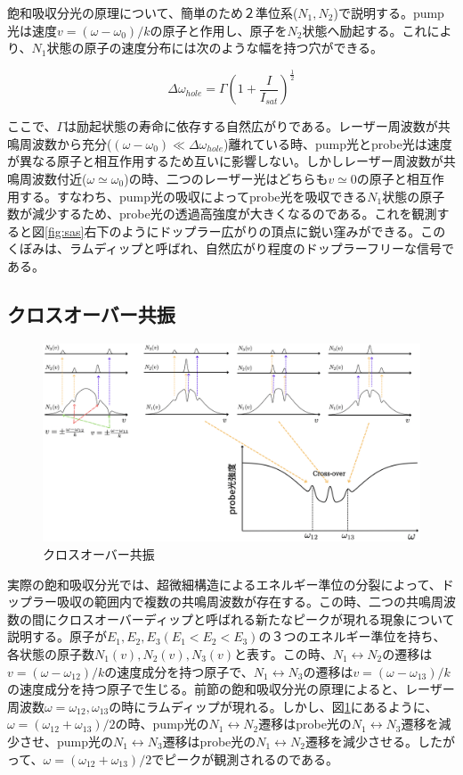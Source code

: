 \documentclass[dvipdfmx]{jsreport}
\begin{document}
飽和吸収分光の原理について、簡単のため２準位系($N_1, N_2$)で説明する。pump光は速度$v = (\omega - \omega_0)/k$の原子と作用し、原子を$N_2$状態へ励起する。これにより、$N_1$状態の原子の速度分布には次のような幅を持つ穴ができる。\cite{foot}

\begin{equation}
\Delta\omega_{hole} = \Gamma \left( 1 + \frac{I}{I_{sat}} \right) ^ \frac{1}{2}
\end{equation}

ここで、$\Gamma$は励起状態の寿命に依存する自然広がりである。レーザー周波数が共鳴周波数から充分($(\omega - \omega_0) \ll \Delta\omega_{hole}$)離れている時、pump光とprobe光は速度が異なる原子と相互作用するため互いに影響しない。しかしレーザー周波数が共鳴周波数付近($\omega \simeq \omega_0$)の時、二つのレーザー光はどちらも$v \simeq 0$の原子と相互作用する。すなわち、pump光の吸収によってprobe光を吸収できる$N_1$状態の原子数が減少するため、probe光の透過高強度が大きくなるのである。これを観測すると図\ref{fig:sas}右下のようにドップラー広がりの頂点に鋭い窪みができる。このくぼみは、ラムディップと呼ばれ、自然広がり程度のドップラーフリーな信号である。

\subsection{クロスオーバー共振}
\begin{figure}
\centering
\includegraphics[width=1\textwidth]{images/cross-over_graph.png}
\caption{\label{fig:cross-over}クロスオーバー共振}
\end{figure}
実際の飽和吸収分光では、超微細構造によるエネルギー準位の分裂によって、ドップラー吸収の範囲内で複数の共鳴周波数が存在する。この時、二つの共鳴周波数の間にクロスオーバーディップと呼ばれる新たなピークが現れる現象について説明する。原子が$E_1, E_2, E_3(E_1 < E_2 < E_3)$の３つのエネルギー準位を持ち、各状態の原子数$N_1(v), N_2(v), N_3(v)$と表す。この時、$N_1\leftrightarrow N_2$の遷移は$v = (\omega - \omega_{12})/k$の速度成分を持つ原子で、$N_1\leftrightarrow N_3$の遷移は$v = (\omega - \omega_{13})/k$の速度成分を持つ原子で生じる。前節の飽和吸収分光の原理によると、レーザー周波数$\omega = \omega_{12}, \omega_{13}$の時にラムディップが現れる。しかし、図\ref{fig:cross-over}にあるように、$\omega = \left(\omega_{12} + \omega_{13} \right) / 2$の時、pump光の$N_1\leftrightarrow N_2$遷移はprobe光の$N_1\leftrightarrow N_3$遷移を減少させ、pump光の$N_1\leftrightarrow N_3$遷移はprobe光の$N_1\leftrightarrow N_2$遷移を減少させる。したがって、$\omega = \left(\omega_{12} + \omega_{13} \right) / 2$でピークが観測されるのである。
\end{document}
